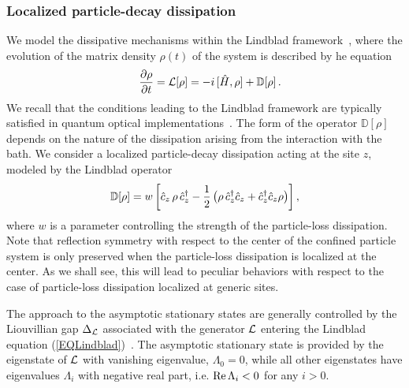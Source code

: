   
  
  \subsubsection{Localized particle-decay dissipation}
  \label{locdiss}
  
  We model the dissipative mechanisms within the Lindblad
  framework~\cite{Lindblad-76,GKS-76}, where the evolution of the matrix
  density $\rho(t)$ of the system is described by he
  equation~\cite{BP-openquantumsystembook,RH-book}
  \begin{eqnarray}
  &&  {\partial\rho\over \partial t} = {\cal L}[\rho]=
    - i \, [ \hat H,\rho]
    + {\mathbb D}[\rho]\,.
    \label{EQLindblad}
  \end{eqnarray}
  We recall that the conditions leading to the Lindblad framework are
  typically satisfied in quantum optical
  implementations~\cite{BDS-2015-KeldyshOptical,dr2021self}.  The form of the operator
  ${\mathbb D}[\rho]$ depends on the nature of the dissipation arising
  from the interaction with the bath.  We consider a localized
  particle-decay dissipation acting at the site $z$, modeled by the
  Lindblad operator~\cite{HC-13, KMSFR-17, N-2019-uniquenesslindblad, NRV-2019-competingdissipativeandcoherent, WSDK-20,
    FMKCD-20, dr2021self,rossini2021coherent}
  \begin{eqnarray}
  \mathbb{D}[\rho] = w\,\biggr[
      \hat c_{z}\,\rho\,\hat c_{z}^\dagger - {1\over 2}\left( \rho\,
      \hat c_z^\dagger \hat c_{z} + \hat c_z^\dagger \hat c_{z} \rho \right)
      \biggr] \,, 
  \label{Lindop}
  \end{eqnarray}
  where $w$ is a parameter controlling the strength of the particle-loss
  dissipation.
  Note that reflection symmetry with respect to
    the center of the confined particle system is only preserved when
    the particle-loss dissipation is localized at the center. As we
    shall see, this will lead to peculiar behaviors with respect to the
    case of particle-loss dissipation localized at generic sites.
  
  
  
  The approach to the asymptotic stationary states are generally
  controlled by the Liouvillian gap $\Delta_{\cal L}$ associated with
  the generator ${\cal L}$ entering the Lindblad equation
  (\ref{EQLindblad})~\cite{BP-openquantumsystembook,RH-book,Z-2015-relaxtimes,MBBC-18,KS-2020-boundarydephasing}.
  The asymptotic stationary state is provided by the eigenstate of
  ${\cal L}$ with vanishing eigenvalue, $\Lambda_0=0$, while all other
  eigenstates have eigenvalues $\Lambda_i$ with negative real part,
  i.e. ${\rm Re}\,\Lambda_i<0$ for any $i>0$.
  
